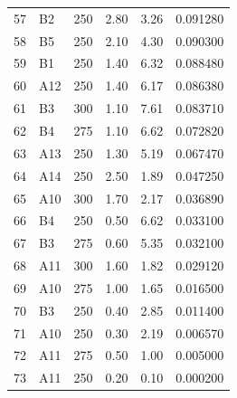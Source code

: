 \begin{longtable}{C{0.07\textwidth}C{0.08\textwidth}C{0.11\textwidth}C{0.18\textwidth}C{0.18\textwidth}C{0.18\textwidth}}
57 & B2 & 250 & 2.80 & 3.26 & 0.091280 \\
58 & B5 & 250 & 2.10 & 4.30 & 0.090300 \\
59 & B1 & 250 & 1.40 & 6.32 & 0.088480 \\
60 & A12 & 250 & 1.40 & 6.17 & 0.086380 \\
61 & B3 & 300 & 1.10 & 7.61 & 0.083710 \\
62 & B4 & 275 & 1.10 & 6.62 & 0.072820 \\
63 & A13 & 250 & 1.30 & 5.19 & 0.067470 \\
64 & A14 & 250 & 2.50 & 1.89 & 0.047250 \\
65 & A10 & 300 & 1.70 & 2.17 & 0.036890 \\
66 & B4 & 250 & 0.50 & 6.62 & 0.033100 \\
67 & B3 & 275 & 0.60 & 5.35 & 0.032100 \\
68 & A11 & 300 & 1.60 & 1.82 & 0.029120 \\
69 & A10 & 275 & 1.00 & 1.65 & 0.016500 \\
70 & B3 & 250 & 0.40 & 2.85 & 0.011400 \\
71 & A10 & 250 & 0.30 & 2.19 & 0.006570 \\
72 & A11 & 275 & 0.50 & 1.00 & 0.005000 \\
73 & A11 & 250 & 0.20 & 0.10 & 0.000200 \\
\bottomrule
\end{longtable}
